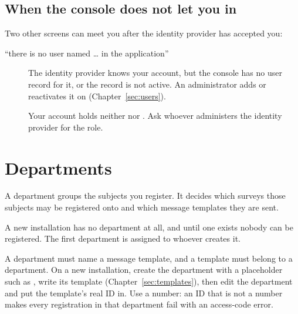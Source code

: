 \documentclass[11pt, a4paper]{article}
\newcommand{\adminonly}{%
  \marginpar{\raggedright\footnotesize\textcolor{elicitVerdigris}{\textsf{Administrator}}}%
}
\begin{document}
\subsection{When the console does not let you in}

Two other screens can meet you after the identity provider has accepted you:

\begin{description}
  \item[“there is no user named … in the application”] The identity provider knows your
        account, but the console has no user record for it, or the record is not active. An
        administrator adds or reactivates it on  (Chapter~\ref{sec:users}).
  \item[] Your account holds neither  nor
        . Ask whoever administers the identity provider for the role.
\end{description}


\section{Departments}\adminonly
\label{sec:departments}

A department groups the subjects you register. It decides which surveys those subjects may be
registered onto and which message templates they are sent.

A new installation has no department at all, and until one exists nobody can be registered. The
first department is assigned to whoever creates it.

\begin{elicitnote}
A department must name a message template, and a template must belong to a department. On a new
installation, create the department with a placeholder  such as
, write its template (Chapter~\ref{sec:templates}), then edit the department and put the
template's real ID in. Use a number: an ID that is not a number makes every registration in
that department fail with an access-code error.
\end{elicitnote}
\end{document}
